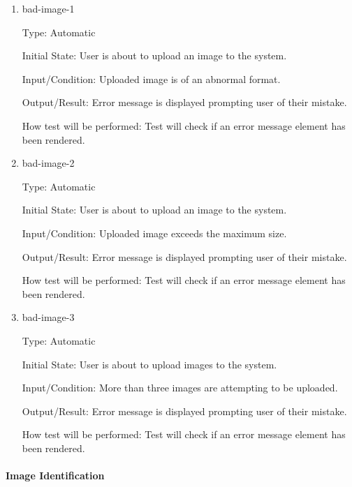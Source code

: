 \documentclass[12pt, titlepage]{article}
\begin{document}
	\begin{enumerate}
		
		\item{bad-image-1\\}
		
		Type: Automatic 
		
		Initial State: User is about to upload an image to the system.
		
		Input/Condition: Uploaded image is of an abnormal format.

		Output/Result: Error message is displayed prompting user of their 
		mistake.
		
		How test will be performed: Test will check if an error message element 
		has been rendered.
		
		\item{bad-image-2\\}
		
		Type: Automatic
		
		Initial State: User is about to upload an image to the system.
		
		Input/Condition: Uploaded image exceeds the maximum size.
		
		Output/Result: Error message is displayed prompting user of their 
		mistake.
		
		How test will be performed: Test will check if an error message element 
		has been rendered.
		
		
		\item{bad-image-3\\}

		Type: Automatic
		
		Initial State: User is about to upload images to the system.
		
		Input/Condition: More than three images are attempting to be uploaded.
		
		Output/Result: Error message is displayed prompting user of their 
		mistake.
		
		How test will be performed: Test will check if an error message element 
		has been rendered.
	\end{enumerate}

	\paragraph{Image Identification}
	
\end{document}
